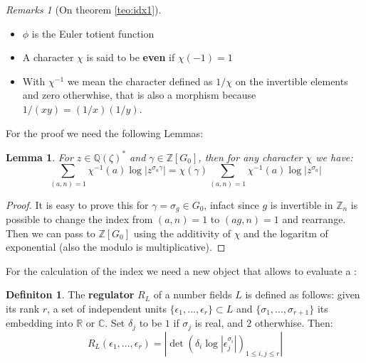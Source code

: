 \documentclass[]{article}
\theoremstyle{plain}
\newtheorem{lem}[teo]{Lemma}
\theoremstyle{remark}
\newtheorem{rems}[rem]{Remarks}
\theoremstyle{definition}
\newtheorem{deff}[teo]{Definiton}
\newcommand{\Z}{\mathbb{Z}}
\newcommand{\Q}{\mathbb{Q}}
\newcommand{\C}{\mathbb{C}}
\newcommand{\R}{\mathbb{R}}
\begin{document}
	\begin{rems}[On theorem \ref{teo:idx1}]
		\begin{itemize}
			\item $\phi$ is the Euler totient function
			\item A character $\chi$ is said to be \textbf{even} if $ \chi (-1) = 1 $
			\item With $ \chi^{-1} $ we mean the character defined as $ 1/\chi $ on the invertible elements and zero otherwhise, that is also a morphism because $ 1/(xy) = (1/x)(1/y)$.
			
			
		\end{itemize}
	\end{rems}

	For the proof we need the following Lemmas:
	
	\begin{lem} \label{lem:fact}
		For $ z \in \Q (\zeta )^\ast  $ and $ \gamma \in \Z [G_0] $, then for any character $\chi$ we have:
		\begin{equation} \label{eq:fact}
			\sum_{(a,n)=1} \chi ^{-1} (a) \log | z ^{\sigma_a \gamma }| = \chi (\gamma) \sum_{(a,n)=1} \chi ^{-1}(a) \log | z ^{\sigma_a  }|
		\end{equation}
	\end{lem}
	\begin{proof}
		It is easy to prove this for $\gamma = \sigma_g \in G_0$, infact since $ g $ is invertible in $ \Z_{n} $ is possible to change the index from $ (a,n)=1 $ to $ (ag,n)=1 $ and rearrange. Then we can pass to $ \Z[G_0] $ using the additivity of $ \chi $ and the logaritm of exponential (also the modulo is multiplicative).
	\end{proof}

	For the calculation of the index we need a new object that allows to evaluate a :
	\begin{deff}
		The \textbf{regulator} $ R_L $ of a number fields $ L $ is defined as follows:
		given its rank $ r $, a set of independent units $ \{\epsilon_1 , ... , \epsilon_r\} \subset L$ and $ \{ \sigma_1 , ... , \sigma_{r+1} \} $ its embedding into $ \R $ or $ \C $. Set $ \delta_j $ to be $ 1 $ if $ \sigma_j $ is real, and $ 2 $ otherwhise. \newline
		Then:
		\begin{equation}
			R_L(\epsilon_1 , ... , \epsilon_r) = | \det (\delta_i \log | \epsilon_j ^{\sigma_i}|)_{1\leq i,j\leq r} |
		\end{equation}
	\end{deff}
	
\end{document}
